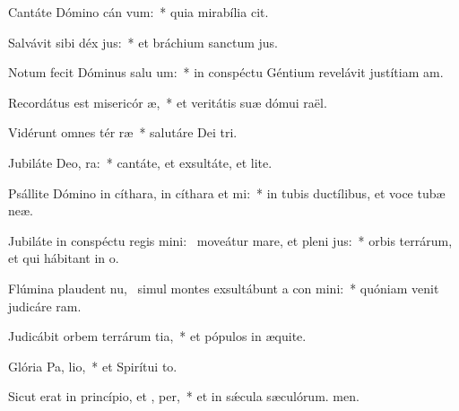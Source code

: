 \item Cantáte Dómino cán vum:~* quia mirabília cit.
\item Salvávit sibi déx jus:~* et bráchium sanctum jus.
\item Notum fecit Dóminus salu um:~* in conspéctu Géntium revelávit justítiam am.
\item Recordátus est misericór æ,~* et veritátis suæ dómui raël.
\item Vidérunt omnes tér ræ~* salutáre Dei tri.
\item Jubiláte Deo,  ra:~* cantáte, et exsultáte, et lite.
\item Psállite Dómino in cíthara, in cíthara et  mi:~* in tubis ductílibus, et voce tubæ neæ.
\item Jubiláte in conspéctu regis mini:~\pscross{} moveátur mare, et pleni jus:~* orbis terrárum, et qui hábitant in o.
\item Flúmina plaudent nu,~\pscross{} simul montes exsultábunt a con mini:~* quóniam venit judicáre ram.
\item Judicábit orbem terrárum  tia,~* et pópulos in æquite.
\item Glória Pa,  lio,~* et Spirítui to.
\item Sicut erat in princípio, et ,  per,~* et in sǽcula sæculórum. men.
